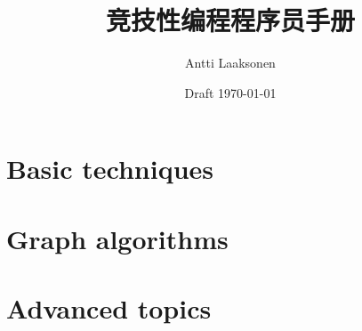 \documentclass[twoside,12pt,a4paper]{book}
\date{Draft \today}
\title{\Huge 竞技性编程程序员手册}
\author{\Large Antti Laaksonen}
\begin{document}
	
	\frontmatter
	\maketitle
	\setcounter{tocdepth}{1}
	\tableofcontents
	
	
	
	\mainmatter
	\setcounter{page}{1}
	
	\newcommand{\key}[1] {\textbf{#1}}
	
	\part{Basic techniques}
	
	
	
	
	
	
	
	
	
	
	\part{Graph algorithms}
	
	
	
	
	
	
	
	
	
	
	\part{Advanced topics}
	
	
	
	
	
	
	
	
	
	
	
	\cleardoublepage
	
	
	\cleardoublepage
	\printindex
	
\end{document}
